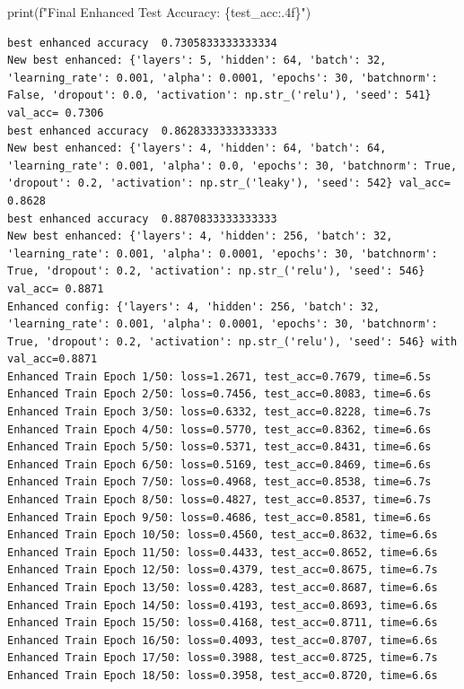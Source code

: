 \documentclass[
  letterpaper,
  DIV=11,
  numbers=noendperiod]{scrartcl}
\newenvironment{Shaded}{\begin{snugshade}}{\end{snugshade}}
\newcommand{\BuiltInTok}[1]{\textcolor[rgb]{0.00,0.23,0.31}{#1}}
\newcommand{\NormalTok}[1]{\textcolor[rgb]{0.00,0.23,0.31}{#1}}
\newcommand{\SpecialCharTok}[1]{\textcolor[rgb]{0.37,0.37,0.37}{#1}}
\newcommand{\SpecialStringTok}[1]{\textcolor[rgb]{0.13,0.47,0.30}{#1}}
\begin{document}
\begin{Shaded}
\begin{Highlighting}[]
\BuiltInTok{print}\NormalTok{(}\SpecialStringTok{f"Final Enhanced Test Accuracy: }\SpecialCharTok{\{}\NormalTok{test\_acc}\SpecialCharTok{:.4f\}}\SpecialStringTok{"}\NormalTok{)}
\end{Highlighting}
\end{Shaded}

\label{prob2_4}
\begin{verbatim}
best enhanced accuracy  0.7305833333333334
New best enhanced: {'layers': 5, 'hidden': 64, 'batch': 32, 'learning_rate': 0.001, 'alpha': 0.0001, 'epochs': 30, 'batchnorm': False, 'dropout': 0.0, 'activation': np.str_('relu'), 'seed': 541} val_acc= 0.7306
best enhanced accuracy  0.8628333333333333
New best enhanced: {'layers': 4, 'hidden': 64, 'batch': 64, 'learning_rate': 0.001, 'alpha': 0.0, 'epochs': 30, 'batchnorm': True, 'dropout': 0.2, 'activation': np.str_('leaky'), 'seed': 542} val_acc= 0.8628
best enhanced accuracy  0.8870833333333333
New best enhanced: {'layers': 4, 'hidden': 256, 'batch': 32, 'learning_rate': 0.001, 'alpha': 0.0001, 'epochs': 30, 'batchnorm': True, 'dropout': 0.2, 'activation': np.str_('relu'), 'seed': 546} val_acc= 0.8871
Enhanced config: {'layers': 4, 'hidden': 256, 'batch': 32, 'learning_rate': 0.001, 'alpha': 0.0001, 'epochs': 30, 'batchnorm': True, 'dropout': 0.2, 'activation': np.str_('relu'), 'seed': 546} with val_acc=0.8871
Enhanced Train Epoch 1/50: loss=1.2671, test_acc=0.7679, time=6.5s
Enhanced Train Epoch 2/50: loss=0.7456, test_acc=0.8083, time=6.6s
Enhanced Train Epoch 3/50: loss=0.6332, test_acc=0.8228, time=6.7s
Enhanced Train Epoch 4/50: loss=0.5770, test_acc=0.8362, time=6.6s
Enhanced Train Epoch 5/50: loss=0.5371, test_acc=0.8431, time=6.6s
Enhanced Train Epoch 6/50: loss=0.5169, test_acc=0.8469, time=6.6s
Enhanced Train Epoch 7/50: loss=0.4968, test_acc=0.8538, time=6.7s
Enhanced Train Epoch 8/50: loss=0.4827, test_acc=0.8537, time=6.7s
Enhanced Train Epoch 9/50: loss=0.4686, test_acc=0.8581, time=6.6s
Enhanced Train Epoch 10/50: loss=0.4560, test_acc=0.8632, time=6.6s
Enhanced Train Epoch 11/50: loss=0.4433, test_acc=0.8652, time=6.6s
Enhanced Train Epoch 12/50: loss=0.4379, test_acc=0.8675, time=6.7s
Enhanced Train Epoch 13/50: loss=0.4283, test_acc=0.8687, time=6.6s
Enhanced Train Epoch 14/50: loss=0.4193, test_acc=0.8693, time=6.6s
Enhanced Train Epoch 15/50: loss=0.4168, test_acc=0.8711, time=6.6s
Enhanced Train Epoch 16/50: loss=0.4093, test_acc=0.8707, time=6.6s
Enhanced Train Epoch 17/50: loss=0.3988, test_acc=0.8725, time=6.7s
Enhanced Train Epoch 18/50: loss=0.3958, test_acc=0.8720, time=6.6s

\end{verbatim}
\end{document}
